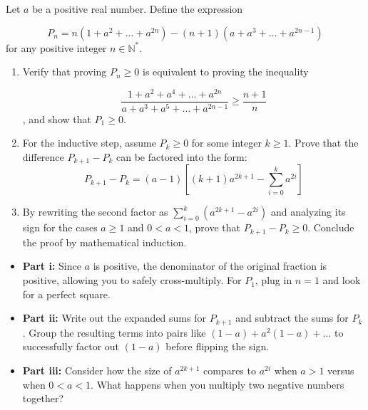 \begin{problem}
Let $a$ be a positive real number. Define the expression 

$$P_n = n(1+a^2+\dots+a^{2n}) - (n+1)(a+a^3+\dots+a^{2n-1})$$
for any positive integer $n \in \mathbb{N}^*$.

\begin{enumerate}
    \item[\textbf{i)}] Verify that proving $P_n \ge 0$ is equivalent to proving the inequality 
    
    $$\frac{1 + a^2 + a^4 + \dots + a^{2n}}{a + a^3 + a^5 + \dots + a^{2n-1}} \ge \frac{n+1}{n}$$, 
    and show that $P_1 \ge 0$.
    \item[\textbf{ii)}] For the inductive step, assume $P_k \ge 0$ for some integer $k \ge 1$. Prove that the difference $P_{k+1} - P_k$ can be factored into the form: 
    \[ P_{k+1} - P_k = (a-1) \left[ (k+1)a^{2k+1} - \sum_{i=0}^{k} a^{2i} \right] \]
    \item[\textbf{iii)}] By rewriting the second factor as $\sum_{i=0}^k (a^{2k+1} - a^{2i})$ and analyzing its sign for the cases $a \ge 1$ and $0 < a < 1$, prove that $P_{k+1} - P_k \ge 0$. Conclude the proof by mathematical induction.
\end{enumerate}
\end{problem}

\begin{hint}
\begin{itemize}
    \item \textbf{Part i:} Since $a$ is positive, the denominator of the original fraction is positive, allowing you to safely cross-multiply. For $P_1$, plug in $n=1$ and look for a perfect square.
    \item \textbf{Part ii:} Write out the expanded sums for $P_{k+1}$ and subtract the sums for $P_k$. Group the resulting terms into pairs like $(1-a) + a^2(1-a) + \dots$ to successfully factor out $(1-a)$ before flipping the sign. 
    \item \textbf{Part iii:} Consider how the size of $a^{2k+1}$ compares to $a^{2i}$ when $a > 1$ versus when $0 < a < 1$. What happens when you multiply two negative numbers together? 
\end{itemize}
\end{hint}

